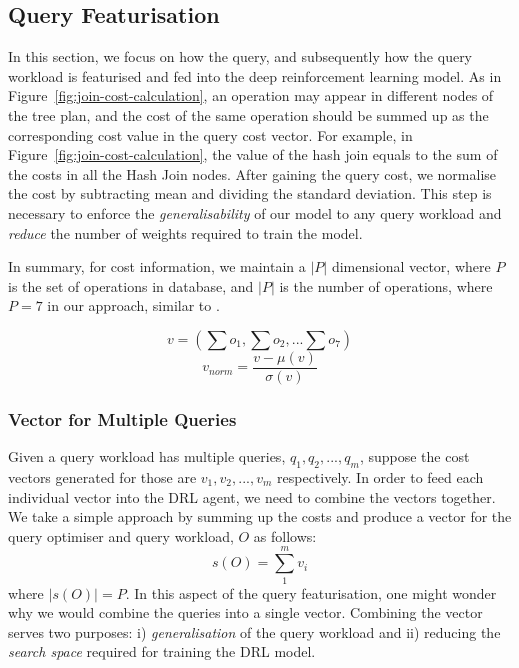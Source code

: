 \subsection{Query Featurisation}
In this section, we focus on how the query, and subsequently how the query workload is featurised and fed into the deep reinforcement learning model. As in Figure~\ref{fig:join-cost-calculation}, an operation may appear in different nodes of the tree plan, and the cost of the same operation should be summed up as the corresponding cost value in the query cost vector. For example, in Figure~\ref{fig:join-cost-calculation}, the value of the hash join equals to the sum of the costs in all the Hash Join nodes. After gaining the query cost, we normalise the cost by subtracting mean and dividing the standard deviation. This step is necessary to enforce the \textit{generalisability} of our model to any query workload and \textit{reduce} the number of weights required to train the model.

In summary, for cost information, we maintain a $|P|$ dimensional vector, where $P$ is the set of operations in database, and $|P|$ is the number of operations, where $P = 7$ in our approach, similar to \cite{DBLP:journals/pvldb/LiZLG19}.

\begin{equation}
    v = (\sum o_1, \sum o_2, ... \sum o_7)
\end{equation}
\begin{equation}
    v_{norm} = \frac{v - \mu(v)}{\sigma(v)}
\end{equation}
    

\subsubsection{Vector for Multiple Queries}
Given a query workload has multiple queries, $q_1, q_2, ... , q_m$, suppose the cost vectors generated for those are $v_1, v_2, ..., v_m$ respectively. In order to feed each individual vector into the DRL agent, we need to combine the vectors together. We take a simple approach by summing up the costs and produce a vector for the query optimiser and query workload, $O$ as follows:
\begin{equation}
    s(O) = \sum_{1}^{m} v_i
    \label{eq:first-s(O)}
\end{equation}
where $|s(O)| = P$. In this aspect of the query featurisation, one might wonder why we would combine the queries into a single vector. Combining the vector serves two purposes: i) \textit{generalisation} of the query workload and ii) reducing the \textit{search space} required for training the DRL model.  

